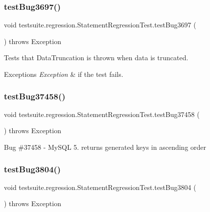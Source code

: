 \subsubsection{\texorpdfstring{test\+Bug3697()}{testBug3697()}}
{\footnotesize\ttfamily void testsuite.\+regression.\+Statement\+Regression\+Test.\+test\+Bug3697 (\begin{DoxyParamCaption}{ }\end{DoxyParamCaption}) throws Exception}

Tests that Data\+Truncation is thrown when data is truncated.


\begin{DoxyExceptions}{Exceptions}
{\em Exception} & if the test fails. \\
\hline
\end{DoxyExceptions}
\mbox{\label{classtestsuite_1_1regression_1_1_statement_regression_test_a58a021ee89bb1a822729f1cafec75c37}} 
\subsubsection{\texorpdfstring{test\+Bug37458()}{testBug37458()}}
{\footnotesize\ttfamily void testsuite.\+regression.\+Statement\+Regression\+Test.\+test\+Bug37458 (\begin{DoxyParamCaption}{ }\end{DoxyParamCaption}) throws Exception}

Bug \#37458 -\/ My\+S\+QL 5. returns generated keys in ascending order \mbox{\label{classtestsuite_1_1regression_1_1_statement_regression_test_aa50b1c76440598f989c311efbcc037df}} 
\subsubsection{\texorpdfstring{test\+Bug3804()}{testBug3804()}}
{\footnotesize\ttfamily void testsuite.\+regression.\+Statement\+Regression\+Test.\+test\+Bug3804 (\begin{DoxyParamCaption}{ }\end{DoxyParamCaption}) throws Exception}

